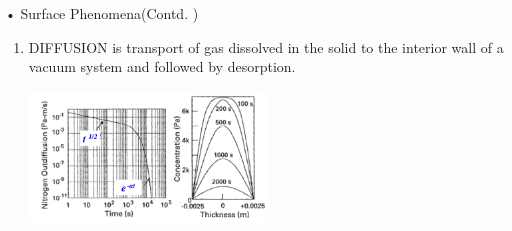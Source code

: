 \documentclass[11]{beamer}
\begin{document}
\begin{frame}{• Surface Phenomena(Contd. )}

\begin{enumerate}
\item DIFFUSION is transport of gas dissolved in the solid to the interior wall of a vacuum system and followed by desorption.
\begin{center}
   			\includegraphics[width=0.5\textwidth]{Diffusion.png}
  	 \end{center}




\end{enumerate}

	


\end{frame}
\end{document}
